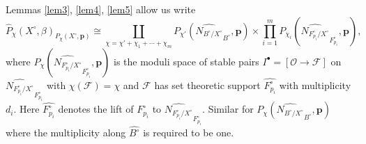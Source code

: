 \documentclass[12pt]{amsart}
\theoremstyle{definition}
\theoremstyle{property}
\renewcommand\O{\mathcal O}
\newcommand\mdot{{\scriptscriptstyle\bullet}}
\newcommand\F{\mathcal F}
\newcommand\p{\mathbf{p}}
\renewcommand\_{^{}_}
\begin{document}
Lemmas \ref{lem3}, \ref{lem4}, \ref{lem5} allow us write
$$
\widehat{P}_{\chi}(X^\circ,\beta)_{P_{\chi}(X^\circ,\p)} \cong \coprod_{\chi = \chi' + \chi_1 + \cdots + \chi_{m}} P_{\chi'}(\widehat{N_{B^{\circ} / X^\circ}}_{B^\circ}, \p) \times \prod_{i=1}^{m} P_{\chi_i}(\widehat{N_{F_{p_i}^{\circ} / X^\circ}}_{F_{p_i}^{\circ}},\p),
$$
where $P_{\chi}(\widehat{N_{F_{p_i}^{\circ} / X^\circ}}_{F_{p_i}^{\circ}}, \p)$ is the moduli space of stable pairs $I^\mdot = [\O \rightarrow \F]$ on $\widehat{N_{F_{p_i}^{\circ} / X^\circ}}_{F_{p_i}^{\circ}}$ with $\chi(\F) = \chi$ and $\F$ has set theoretic support $\widehat{F_{p_i}^{\circ}}$ with multiplicity $d_i$. Here $\widehat{F_{p_i}^{\circ}}$ denotes the lift of $F_{p_i}^\circ$ to $\widehat{N_{F_{p_i}^{\circ} / X^\circ}}_{F_{p_i}^{\circ}}$. Similar for $P_{\chi}(\widehat{N_{B^{\circ} / X^\circ}}_{B^{\circ}},\p)$ where the multiplicity along $\widehat{B^\circ}$ is required to be one.
\end{document}
